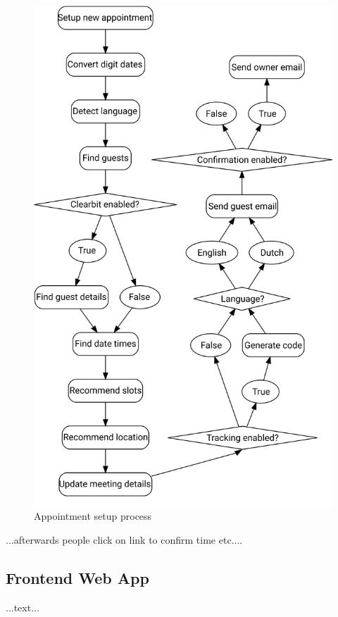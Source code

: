 \documentclass{article}
\begin{document}
\begin{figure}\centering
	\includegraphics[scale=0.4]{schedule-process.png}
	\caption{Appointment setup process}
\end{figure}

...afterwards people click on link to confirm time etc....

\subsection{Frontend Web App}

...text...
\end{document}
